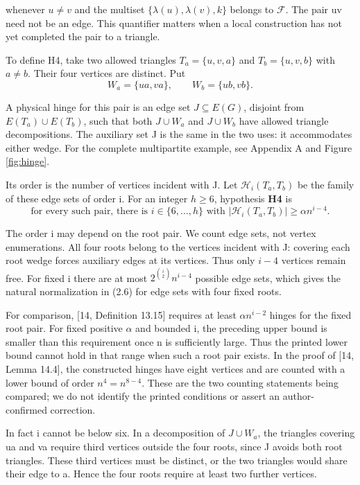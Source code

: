 \documentclass[english,11pt,a4paper]{article}
\begin{document}
whenever \(u\ne v\) and the multiset \(\{\lambda(u),\lambda(v),k\}\) belongs to \(\mathcal F\). The pair uv need not be an edge. This quantifier matters when a local construction has not yet completed the pair to a triangle.

To define H4, take two allowed triangles \(T_a=\{u,v,a\}\) and \(T_b=\{u,v,b\}\) with \(a\ne b\). Their four vertices are distinct. Put
\[W_a=\{ua,va\},\qquad W_b=\{ub,vb\}.\]

A physical hinge for this pair is an edge set \(J\subseteq E(G)\), disjoint from \(E(T_a)\cup E(T_b)\), such that both \(J\cup W_a\) and \(J\cup W_b\) have allowed triangle decompositions. The auxiliary set J is the same in the two uses: it accommodates either wedge. For the complete multipartite example, see Appendix A and Figure \ref{fig:hinge}.

Its order is the number of vertices incident with J. Let \(\mathcal H_i(T_a,T_b)\) be the family of these edge sets of order i. For an integer \(h\geq6\), hypothesis \textbf{H4} is
\[\text{for every such pair, there is }i\in\{6,\ldots,h\}
\text{ with }|\mathcal H_i(T_a,T_b)|\geq\alpha n^{i-4}.        \tag{2.6}\]

The order i may depend on the root pair. We count edge sets, not vertex enumerations. All four roots belong to the vertices incident with J: covering each root wedge forces auxiliary edges at its vertices. Thus only \(i-4\) vertices remain free. For fixed i there are at most \(2^{\binom{i}{2}}n^{i-4}\) possible edge sets, which gives the natural normalization in (2.6) for edge sets with four fixed roots.

For comparison, {[}14, Definition 13.15{]} requires at least \(\alpha n^{i-2}\) hinges for the fixed root pair. For fixed positive \(\alpha\) and bounded i, the preceding upper bound is smaller than this requirement once n is sufficiently large. Thus the printed lower bound cannot hold in that range when such a root pair exists. In the proof of {[}14, Lemma 14.4{]}, the constructed hinges have eight vertices and are counted with a lower bound of order \(n^4=n^{8-4}\). These are the two counting statements being compared; we do not identify the printed conditions or assert an author-confirmed correction.

In fact i cannot be below six. In a decomposition of \(J\cup W_a\), the triangles covering ua and va require third vertices outside the four roots, since J avoids both root triangles. These third vertices must be distinct, or the two triangles would share their edge to a. Hence the four roots require at least two further vertices.
\end{document}
